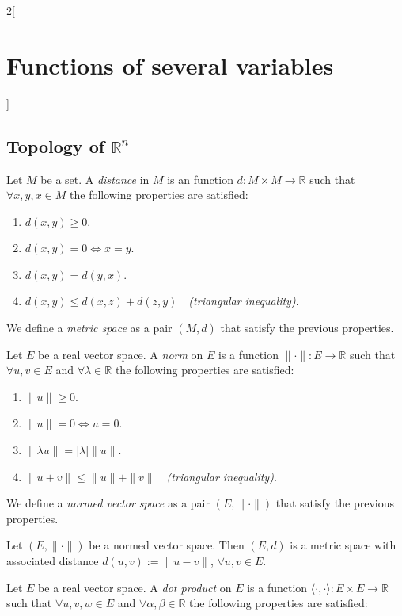 \documentclass[../../../main.tex]{subfiles}
\begin{document}
\begin{multicols}{2}[\section{Functions of several variables}]
\subsection{Topology of \texorpdfstring{$\mathbb{R}^n$}{Rn}}
\begin{definition}
Let $M$ be a set. A \textit{distance} in $M$ is an function $d:M\times M\rightarrow\mathbb{R}$ such that $\forall x,y,x\in M$ the following properties are satisfied:
\begin{enumerate}
    \item $d(x,y)\geq 0$.
    \item $d(x,y)=0\iff x=y$.
    \item $d(x,y)=d(y,x)$.
    \item $d(x,y)\leq d(x,z)+d(z,y)\quad$\textit{(triangular inequality)}.
\end{enumerate}
We define a \textit{metric space} as a pair $(M,d)$ that satisfy the previous properties.
\label{FOSV_metric}
\end{definition}
\begin{definition}
Let $E$ be a real vector space. A \textit{norm} on $E$ is a function $\|\cdot\|:E\rightarrow\mathbb{R}$ such that $\forall u,v\in E$ and $\forall\lambda\in\mathbb{R}$ the following properties are satisfied:
\begin{enumerate}
    \item $\|u\|\geq 0$.
    \item $\|u\|=0\iff u=0$.
    \item $\|\lambda u\|=|\lambda|\|u\|$.
    \item $\|u+v\|\leq \|u\|+\|v\|\quad$\textit{(triangular inequality)}.
\end{enumerate}
We define a \textit{normed vector space} as a pair $(E,\|\cdot\|)$ that satisfy the previous properties.
\end{definition}
\begin{prop}
Let $(E,\|\cdot\|)$ be a normed vector space. Then $(E,d)$ is a metric space with associated distance $d(u,v):=\|u-v\|$, $\forall u,v\in E$.
\end{prop}
\begin{definition}
Let $E$ be a real vector space. A \textit{dot product} on $E$ is a function $\langle\cdot,\cdot\rangle:E\times E\rightarrow\mathbb{R}$ such that $\forall u,v,w\in E$ and $\forall\alpha,\beta\in\mathbb{R}$ the following properties are satisfied:

\end{definition}
\end{multicols}
\end{document}
